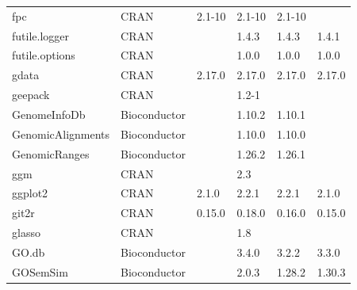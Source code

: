 \begin{longtable}{llllll}
\rowcolor{black!5}
fpc                           & CRAN                      & 2.1-10      & 2.1-10      & 2.1-10         &                    \\
\rowcolor{black!10}
futile.logger                 & CRAN                      &             & 1.4.3       & 1.4.3          & 1.4.1             \\
\rowcolor{black!5}
futile.options                & CRAN                      &             & 1.0.0       & 1.0.0          & 1.0.0              \\
\rowcolor{black!10}
gdata                         & CRAN                      & 2.17.0      & 2.17.0      & 2.17.0         & 2.17.0            \\
\rowcolor{black!5}
geepack                       & CRAN                      &             & 1.2-1       &                &                    \\
\rowcolor{black!10}
GenomeInfoDb                  & Bioconductor              &             & 1.10.2      & 1.10.1         &                   \\
\rowcolor{black!5}
GenomicAlignments             & Bioconductor              &             & 1.10.0      & 1.10.0         &                    \\
\rowcolor{black!10}
GenomicRanges                 & Bioconductor              &             & 1.26.2      & 1.26.1         &                   \\
\rowcolor{black!5}
ggm                           & CRAN                      &             & 2.3         &                &                    \\
\rowcolor{black!10}
ggplot2                       & CRAN                      & 2.1.0       & 2.2.1       & 2.2.1          & 2.1.0             \\
\rowcolor{black!5}
git2r                         & CRAN                      & 0.15.0      & 0.18.0      & 0.16.0         & 0.15.0             \\
\rowcolor{black!10}
glasso                        & CRAN                      &             & 1.8         &                &                   \\
\rowcolor{black!5}
GO.db                         & Bioconductor              &             & 3.4.0       & 3.2.2          & 3.3.0              \\
\rowcolor{black!10}
GOSemSim                      & Bioconductor              &             & 2.0.3       & 1.28.2         & 1.30.3            \\

\end{longtable}
